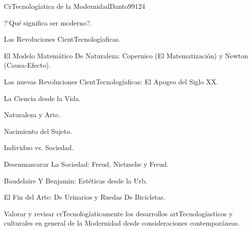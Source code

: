 \begin{syllabus}
\begin{competences}
    \item {}
    \item {}
    \item {}
    \item {}
\end{competences}

\begin{unit}{CrTecnologíatica de la Modernidad}{}{Danto99}{12}{4}
   \begin{topics}
      \item ?`Qué significa ser moderno?.
      \item Las Revoluciones CientTecnologíaficas.
      \item El Modelo Matemático De Naturaleza: Copernico (El Matematización) y Newton (Causa-Efecto).
      \item Las nuevas Revoluciones CientTecnologíaficas: El Apogeo del Siglo XX.
      \item La Ciencia desde la Vida.
      \item Naturaleza y Arte.
      \item Nacimiento del Sujeto.
      \item Individuo vs. Sociedad.
      \item Desenmascarar La Sociedad: Freud, Nietzsche y Freud.
      \item Baudelaire Y Benjamin: Estéticas desde la Urb.
      \item El Fin del Arte: De Urinarios y Ruedas De Bicicletas.
   \end{topics}
   \begin{learningoutcomes}
      \item Valorar y revisar crTecnologíaticamente los desarrollos artTecnologíasticos y culturales en general de la Modernidad desde consideraciones contemporáneas.
   \end{learningoutcomes}
\end{unit}



\begin{coursebibliography}
\end{coursebibliography}

\end{syllabus}

